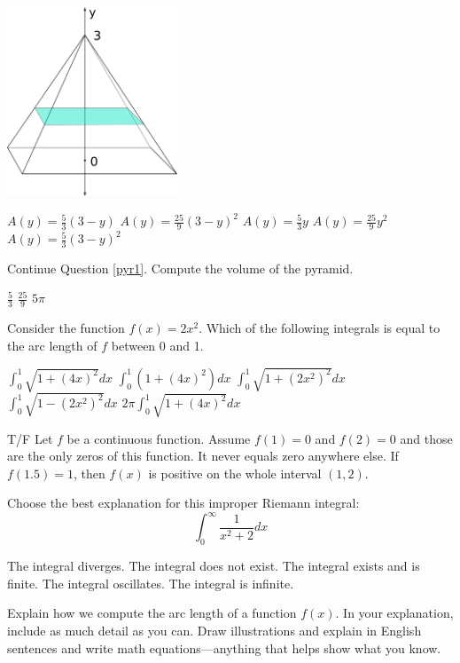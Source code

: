 \documentclass[10pt]{exam}
\begin{document}
\begin{questions}
\includegraphics[width=2in]{images/pyramid}

\begin{choices}


\choice  $A(y) = \frac{5}{3}(3-y)$
\choice  $A(y) = \frac{25}{9}(3-y)^2$ %
\choice $A(y) = \frac{5}{3} y$
\choice $A(y) = \frac{25}{9} y^2$
\choice  $A(y) = \frac{5}{3}(3-y)^2$

\end{choices}



\question Continue Question \ref{pyr1}.  Compute the volume of the pyramid.

\begin{choices}
\choice $\frac{5}{3}$
\choice $\frac{25}{9}$
\choice $5\pi$
\end{choices}


\question  Consider the function $f(x) = 2x^2$.  Which of the following integrals is equal to the arc length of $f$ between 0 and 1.

\begin{choices}
\choice $\int_0^1 \sqrt{1+(4x)^2} dx$
	\choice $\int_0^1 (1+(4x)^2) dx$
	\choice $\int_0^1 \sqrt{1+(2x^2)^2} dx$
	\choice $\int_0^1 \sqrt{1-(2x^2)^2} dx$
	\choice $2\pi \int_0^1 \sqrt{1+(4x)^2} dx$
\end{choices}



\question T/F Let $f$ be a continuous function.  Assume $f(1)=0$ and $f(2)=0$ and those are the only zeros of this function.  It never equals zero anywhere else. If $f(1.5)=1$, then $f(x)$ is positive on the whole interval $(1,2)$. 

\question Choose the best explanation for this improper Riemann integral:
$$\int_0^\infty \frac{1}{x^2+2}dx$$

\begin{choices}
\choice The integral diverges.
\choice The integral does not exist.
\choice The integral exists and is finite.
\choice The integral oscillates.
\choice The integral is infinite.
	
\end{choices}


\question

Explain how we compute the arc length of a function $f(x)$.  In your explanation, include as much detail as you can.  Draw illustrations and explain in English sentences and write math equations---anything that helps show what you know.






\end{questions}
\end{document}
